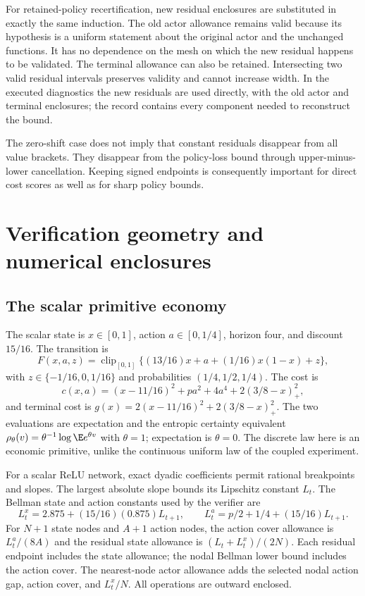 \documentclass[ecta,nameyear,draft]{econsocart}
\begin{document}
For retained-policy recertification, new residual enclosures are substituted in exactly the same induction. The old actor allowance remains valid because its hypothesis is a uniform statement about the original actor and the unchanged functions. It has no dependence on the mesh on which the new residual happens to be validated. The terminal allowance can also be retained. Intersecting two valid residual intervals preserves validity and cannot increase width. In the executed diagnostics the new residuals are used directly, with the old actor and terminal enclosures; the record contains every component needed to reconstruct the bound.

The zero-shift case does not imply that constant residuals disappear from all value brackets. They disappear from the policy-loss bound through upper-minus-lower cancellation. Keeping signed endpoints is consequently important for direct cost scores as well as for sharp policy bounds.

\section{Verification geometry and numerical enclosures}
\subsection{The scalar primitive economy}
The scalar state is $x\in[0,1]$, action $a\in[0,1/4]$, horizon four, and discount $15/16$. The transition is
\[
 F(x,a,z)=\operatorname{clip}_{[0,1]}
       \{(13/16)x+a+(1/16)x(1-x)+z\},
\]
with $z\in\{-1/16,0,1/16\}$ and probabilities $(1/4,1/2,1/4)$. The cost is
\[
 c(x,a)=(x-11/16)^2+pa^2+4a^4+2(3/8-x)_+^2,
\]
and terminal cost is $g(x)=2(x-11/16)^2+2(3/8-x)_+^2$. The two evaluations are expectation and the entropic certainty equivalent $\rho_\theta(v)=\theta^{-1}\log\E e^{\theta v}$ with $\theta=1$; expectation is $\theta=0$. The discrete law here is an economic primitive, unlike the continuous uniform law of the coupled experiment.

For a scalar ReLU network, exact dyadic coefficients permit rational breakpoints and slopes. The largest absolute slope bounds its Lipschitz constant $L_t$. The Bellman state and action constants used by the verifier are
\[
 L_t^x=2.875+(15/16)(0.875)L_{t+1},\qquad
 L_t^a=p/2+1/4+(15/16)L_{t+1}.
\]
For $N+1$ state nodes and $A+1$ action nodes, the action cover allowance is $L_t^a/(8A)$ and the residual state allowance is $(L_t+L_t^x)/(2N)$. Each residual endpoint includes the state allowance; the nodal Bellman lower bound includes the action cover. The nearest-node actor allowance adds the selected nodal action gap, action cover, and $L_t^x/N$. All operations are outward enclosed.
\end{document}
